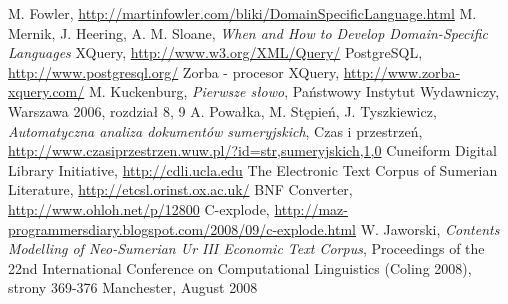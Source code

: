 \documentclass{pracamgr}
\begin{document}
\begin{thebibliography}{99}

 M. Fowler, \url{http://martinfowler.com/bliki/DomainSpecificLanguage.html}
 M. Mernik, J. Heering, A. M. Sloane, \textit{When and How to Develop Domain-Specific Languages}
 XQuery, \url{http://www.w3.org/XML/Query/}
 PostgreSQL, \url{http://www.postgresql.org/}
 Zorba - procesor XQuery, \url{http://www.zorba-xquery.com/}
 M. Kuckenburg, \textit{Pierwsze słowo}, Państwowy Instytut Wydawniczy, Warszawa 2006, rozdział 8, 9
 A. Powałka, M. Stępień, J. Tyszkiewicz, \textit{Automatyczna analiza dokumentów sumeryjskich}, 
Czas i przestrzeń, \url{http://www.czasiprzestrzen.wuw.pl/?id=str,sumeryjskich,1,0}
 Cuneiform Digital Library Initiative, \url{http://cdli.ucla.edu}
 The Electronic Text Corpus of Sumerian Literature, \url{http://etcsl.orinst.ox.ac.uk/}
 BNF Converter, \url{http://www.ohloh.net/p/12800} %
 C-explode, \url{http://maz-programmersdiary.blogspot.com/2008/09/c-explode.html}
 W. Jaworski, \textit{Contents Modelling of Neo-Sumerian Ur III Economic Text Corpus}, 
Proceedings of the 22nd International Conference on Computational Linguistics (Coling 2008), strony 369-376
Manchester, August 2008




\end{thebibliography}

\listoffigures
{}
\end{document}
